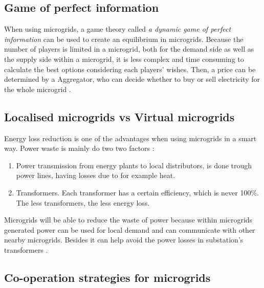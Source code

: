 \subsection{Game of perfect information}
When using microgrids, a game theory called \emph{a dynamic game of perfect information}  can be used to create an equilibrium in microgrids. Because the number of players is limited in a microgrid, both for the demand side as well as the supply side within a microgrid, it is less complex and time consuming to calculate the best options considering each players' wishes. Then, a price can be determined by a Aggregator, who can decide whether to buy or sell electricity for the whole microgrid \cite{MicrogridModellingPetrosAristidou}.

\subsection{Localised microgrids vs Virtual microgrids}
Energy loss reduction is one of the advantages when using microgrids in a smart way. Power waste is mainly do two two factors \cite{EnergyLossURL}: 

\begin{enumerate}
\item Power transmission from energy plants to local distributors, is done trough power lines, having losses due to for example heat.
\item Transformers. Each transformer has a certain efficiency, which is never 100\%. The less transformers, the less energy loss.
\end{enumerate}

Microgrids will be able to reduce the waste of power because within microgrids generated power can be used for local demand and can communicate with other nearby microgrids. Besides it can help avoid the power losses in substation's transformers \cite{keypaper}.

\subsection{Co-operation strategies for microgrids}



